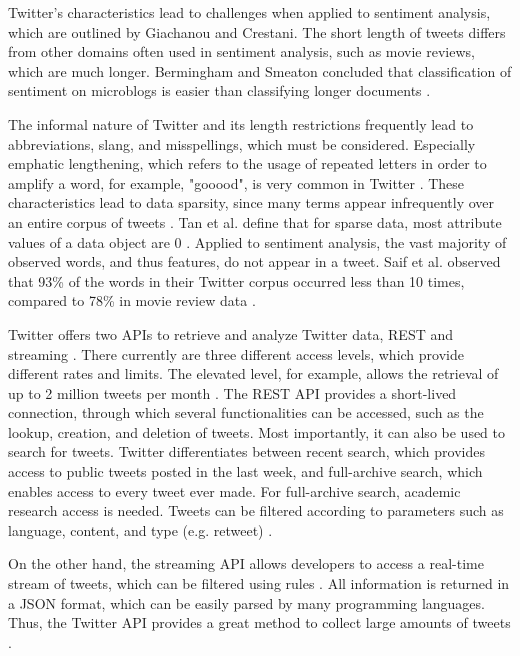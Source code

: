 Twitter's characteristics lead to challenges when applied to sentiment analysis, which are outlined by Giachanou and Crestani. The short length of tweets differs from other domains often used in sentiment analysis, such as movie reviews, which are much longer. Bermingham and Smeaton concluded that classification of sentiment on microblogs is easier than classifying longer documents \cite{microblogs}.

The informal nature of Twitter and its length restrictions frequently lead to abbreviations, slang, and misspellings, which must be considered. Especially emphatic lengthening, which refers to the usage of repeated letters in order to amplify a word, for example, "gooood", is very common in Twitter \cite{DBLP:journals/csur/GiachanouC16}. These characteristics lead to data sparsity, since many terms appear infrequently over an entire corpus of tweets \cite{DBLP:journals/csur/GiachanouC16}. Tan et al. define that for sparse data, most attribute values of a data object are 0 \cite{DBLP:books/aw/TanSKK2019}. Applied to sentiment analysis, the vast majority of observed words, and thus features, do not appear in a tweet. Saif et al. observed that 93\% of the words in their Twitter corpus occurred less than 10 times, compared to 78\% in movie review data \cite{data_sparsity}. 

Twitter offers two APIs to retrieve and analyze Twitter data, REST and streaming \cite{DBLP:journals/csur/GiachanouC16}. There currently are three different access levels, which provide different rates and limits. The elevated level, for example, allows the retrieval of up to 2 million tweets per month \cite{twitter:about}. The REST API provides a short-lived connection, through which several functionalities can be accessed, such as the lookup, creation, and deletion of tweets. Most importantly, it can also be used to search for tweets. Twitter differentiates between recent search, which provides access to public tweets posted in the last week, and full-archive search, which enables access to every tweet ever made. For full-archive search, academic research access is needed. Tweets can be filtered according to parameters such as language, content, and type (e.g. retweet) \cite{twitter:search}. 

On the other hand, the streaming API allows developers to access a real-time stream of tweets, which can be filtered using rules \cite{twitter:stream}. All information is returned in a JSON format, which can be easily parsed by many programming languages. Thus, the Twitter API provides a great method to collect large amounts of tweets \cite{DBLP:journals/csur/GiachanouC16}.




